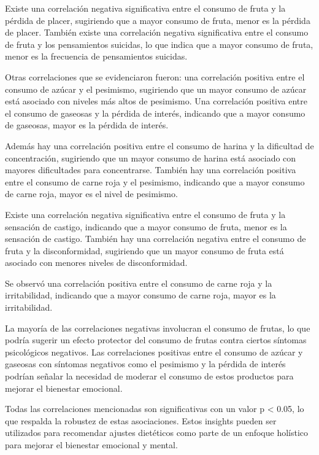 \documentclass[jou]{apa7}
\begin{document}
	Existe una correlación negativa significativa entre el consumo de fruta
	y la pérdida de placer, sugiriendo que a mayor consumo de fruta, menor
	es la pérdida de placer. También existe una correlación negativa
	significativa entre el consumo de fruta y los pensamientos suicidas, lo
	que indica que a mayor consumo de fruta, menor es la frecuencia de
	pensamientos suicidas.
	
	Otras correlaciones que se evidenciaron fueron: una correlación positiva
	entre el consumo de azúcar y el pesimismo, sugiriendo que un mayor
	consumo de azúcar está asociado con niveles más altos de pesimismo. Una
	correlación positiva entre el consumo de gaseosas y la pérdida de
	interés, indicando que a mayor consumo de gaseosas, mayor es la pérdida
	de interés.
	
	Además hay una correlación positiva entre el consumo de harina y la
	dificultad de concentración, sugiriendo que un mayor consumo de harina
	está asociado con mayores dificultades para concentrarse. También hay
	una correlación positiva entre el consumo de carne roja y el pesimismo,
	indicando que a mayor consumo de carne roja, mayor es el nivel de
	pesimismo.
	
	Existe una correlación negativa significativa entre el consumo de fruta
	y la sensación de castigo, indicando que a mayor consumo de fruta, menor
	es la sensación de castigo. También hay una correlación negativa entre
	el consumo de fruta y la disconformidad, sugiriendo que un mayor consumo
	de fruta está asociado con menores niveles de disconformidad.
	
	Se observó una correlación positiva entre el consumo de carne roja y la
	irritabilidad, indicando que a mayor consumo de carne roja, mayor es la
	irritabilidad.
	
	La mayoría de las correlaciones negativas involucran el consumo de
	frutas, lo que podría sugerir un efecto protector del consumo de frutas
	contra ciertos síntomas psicológicos negativos. Las correlaciones
	positivas entre el consumo de azúcar y gaseosas con síntomas negativos
	como el pesimismo y la pérdida de interés podrían señalar la necesidad
	de moderar el consumo de estos productos para mejorar el bienestar
	emocional.
	
	Todas las correlaciones mencionadas son significativas con un valor p
	\textless{} 0.05, lo que respalda la robustez de estas asociaciones.
	Estos insights pueden ser utilizados para recomendar ajustes dietéticos
	como parte de un enfoque holístico para mejorar el bienestar emocional y
	mental.
	
\end{document}
